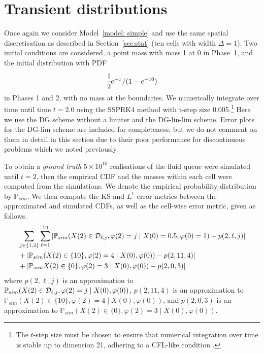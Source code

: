 \section{Transient distributions}\label{sec: transient approx}
Once again we consider Model~\ref{model: simple} and use the same spatial discretisation as described in Section~\ref{sec:stat} (ten cells with width \(\Delta=1\)). Two initial conditions are considered, a point mass with mass 1 at 0 in Phase~1, and the initial distribution with PDF 
\begin{align}
	\cfrac{1}{2}e^{-x}/(1-e^{-10})\label{eqn: exp init cond}
\end{align}
in Phases 1 and 2, with no mass at the boundaries. We numerically integrate over time until time \(t=2.0\) using the SSPRK4 method with t-step size 0.005.\footnote{The \(t\)-step size must be chosen to ensure that numerical integration over time is stable up to dimension 21, adhering to a CFL-like condition \cite[Section~4.8]{nodalDGBook}.} Here we use the DG scheme without a limiter and the DG-lin-lim scheme. Error plots for the DG-lim scheme are included for completeness, but we do not comment on them in detail in this section due to their poor performance for discontinuous problems which we noted previously.

To obtain a \emph{ground truth} \(5\times 10^{10}\) realisations of the fluid queue were simulated until \(t=2\), then the empirical CDF and the masses within each cell were computed from the simulations. We denote the empirical probability distribution by \(\mathbb P_{sim}\). We then compute the KS and \(L^1\) error metrics between the approximated and simulated CDFs, as well as the cell-wise error metric, given as follows. 
\begin{align}
	&\sum_{j\in\{1,2\}}\sum_{\ell=1}^{10} \left|\mathbb P_{sim}(X(2)\in\mathcal{D}_{\ell,j}, \varphi(2)=j\mid X(0)=0.5,\varphi(0)=1)-p(2,\ell,j)\right|\nonumber 
	\\&+\left|\mathbb P_{sim}(X(2)\in\{10\}, \varphi(2)=4\mid X(0),\varphi(0))-p(2,11,4)\right|\nonumber 
	\\&+\left|\mathbb P_{sim}X(2)\in\{0\}, \varphi(2)=3\mid X(0),\varphi(0))-p(2,0,3)\right| \label{eqn: cell errors 2}
\end{align}
where \(p(2,\ell,j)\) is an approximation to \(\mathbb P_{sim}(X(2)\in\mathcal{D}_{\ell,j}, \varphi(2)=j\mid X(0),\varphi(0))\), \(p(2,11,4)\) is an approximation to \(\mathbb P_{sim}(X(2)\in\{10\}, \varphi(2)=4\mid X(0),\varphi(0))\), and \(p(2,0,3)\) is an approximation to \(\mathbb P_{sim}(X(2)\in\{0\}, \varphi(2)=3\mid X(0),\varphi(0))\).

